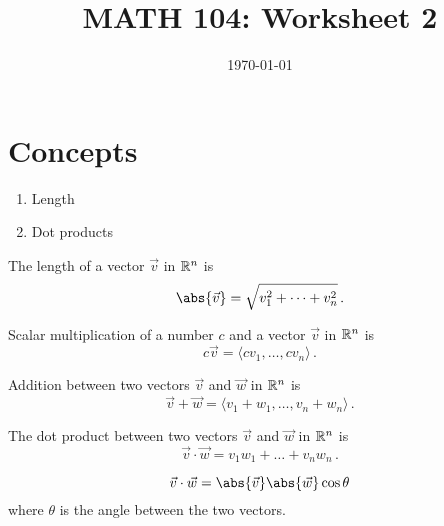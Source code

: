 \documentclass[12pt]{amsart}
\title{ MATH 104: Worksheet 2}
\author{}
\date{\today}
\begin{document}
\maketitle

\section{Concepts}

\begin{enumerate}
	\item Length
	\item Dot products
\end{enumerate}


\begin{definition}
	The length of a vector $\vec{v}$ in $\mathbb{R}^n$ is
	\begin{equation*}
		\abs{ \vec{v}} = \sqrt{ v_1^2 + \dots + v_n^2 } \,.
	\end{equation*}
\end{definition}

\begin{definition}
	Scalar multiplication of a number $c$ and a vector $\vec{v}$ in $\mathbb{R}^n$ is
	\begin{equation*}
		c\vec{v}
		= \langle c v_1 , \dots,  c v_n  \rangle\,.
	\end{equation*}
\end{definition}

\begin{definition}
	Addition between two vectors $\vec{v}$ and $\vec{w}$ in $\mathbb{R}^n$ is
	\begin{equation*}
		\vec{v} + \vec{w} = \langle v_1 + w_1 , \dots,  v_n + w_n \rangle\,.
	\end{equation*}
\end{definition}

\begin{definition}
	The dot product between two vectors $\vec{v}$ and $\vec{w}$ in $\mathbb{R}^n$ is
	\begin{equation*}
		\vec{v} \cdot \vec{w} = v_1 w_1 + \dots + v_n w_n \,.
	\end{equation*}
\end{definition}


\begin{theorem}
	\begin{equation*}
		\vec{v} \cdot \vec{w} = \abs{\vec{v}} \abs{ \vec{w}} \cos\theta
	\end{equation*}
	where $\theta$ is the angle between the two vectors.
\end{theorem}
\end{document}

